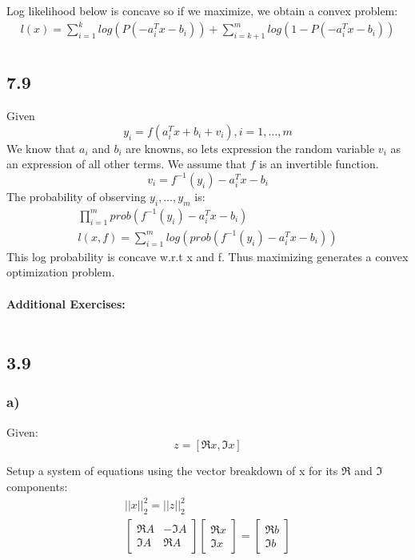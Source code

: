 \documentclass[12pt]{article}
\begin{document}
Log likelihood below is concave so if we maximize, we obtain a convex problem:
\begin{equation*}
\begin{aligned}
l(x) = \sum_{i=1}^{k}log(P(-a_i^Tx-b_i))+\sum_{i=k+1}^{m}log(1-P(-a_i^Tx-b_i))\\ 
\end{aligned}
\end{equation*}

\subsection*{7.9}
Given $$y_i = f(a_i^Tx +b_i +v_i), i=1,\dots,m$$
We know that $a_i$ and $b_i$ are knowns, so lets expression the random variable $v_i$ as an expression of all other terms. We assume that $f$ is an invertible function.
$$v_i = f^{-1}(y_i)-a_i^Tx-b_i$$
The probability of observing $y_i,\dots,y_m$ is:
\begin{equation*}
\begin{aligned}
\prod_{i=1}^{m}prob(f^{-1}(y_i)-a_i^Tx-b_i)\\
l(x, f) = \sum_{i=1}^{m}log(prob(f^{-1}(y_i)-a_i^Tx-b_i))
\end{aligned}
\end{equation*}
This log probability is concave w.r.t x and f. Thus maximizing generates a convex optimization problem.\\\\
\textbf{Additional Exercises:}\\\\
\subsection*{3.9}
\subsubsection*{a)}
Given: $$z = [\Re x, \Im x]$$

Setup a system of equations using the vector breakdown of x for its $\Re$ and $\Im$ components:
\begin{equation*}
\begin{aligned}
||x||_2^2 = ||z||_2^2\\
\begin{bmatrix}
\Re A & -\Im A\\
\Im A & \Re A
\end{bmatrix}
\begin{bmatrix}
\Re x \\
\Im x
\end{bmatrix}=
\begin{bmatrix}
\Re b\\
\Im b
\end{bmatrix}
\end{aligned}
\end{equation*}
\end{document}
